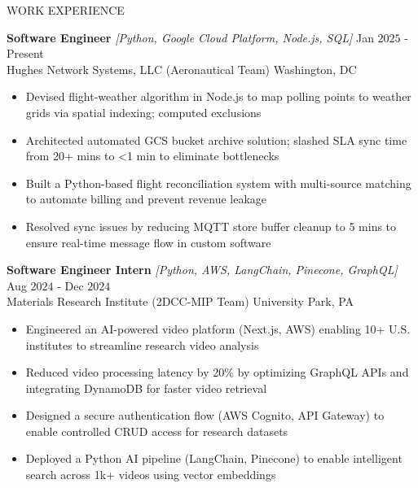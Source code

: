 \documentclass{resume} %
\begin{document}
\begin{rSection}{WORK EXPERIENCE}

{\bf Software Engineer} \textit{[Python, Google Cloud Platform, Node.js, SQL]} \hfill Jan $2025$ - Present\\
Hughes Network Systems, LLC (Aeronautical Team) \hfill Washington, DC
\begin{itemize}[itemsep = -4pt]
    \item Devised flight-weather algorithm in Node.js to map polling points to weather grids via spatial indexing; computed exclusions
    \item Architected automated GCS bucket archive solution; slashed SLA sync time from 20+ mins to \textless 1 min to eliminate bottlenecks
    \item Built a Python-based flight reconciliation system with multi-source matching to automate billing and prevent revenue leakage
    \item Resolved sync issues by reducing MQTT store buffer cleanup to 5 mins to ensure real-time message flow in custom software
\end{itemize}

{\bf Software Engineer Intern} \textit{[Python, AWS, LangChain, Pinecone, GraphQL]} \hfill Aug $2024$ - Dec $2024$\\
Materials Research Institute (2DCC-MIP Team) \hfill University Park, PA
\begin{itemize}[itemsep = -4pt]
    \item Engineered an AI-powered video platform (Next.js, AWS) enabling 10+ U.S. institutes to streamline research video analysis
    \item Reduced video processing latency by 20\% by optimizing GraphQL APIs and integrating DynamoDB for faster video retrieval
    \item Designed a secure authentication flow (AWS Cognito, API Gateway) to enable controlled CRUD access for research datasets
    \item Deployed a Python AI pipeline (LangChain, Pinecone) to enable intelligent search across 1k+ videos using vector embeddings
\end{itemize}


\end{rSection}
\end{document}
